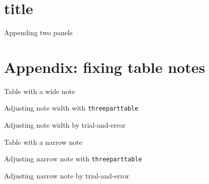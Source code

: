 \documentclass[11pt,a4paper]{article}
\begin{document}
\section{title}
\begin{table}[H]
	\centering
	\caption{Appending two panels}
	\begin{adjustbox}{max width = \textwidth}
		\begin{threeparttable}
			
		\end{threeparttable}
	\end{adjustbox}
\end{table}


\section*{Appendix: fixing table notes}
\setcounter{table}{0}
\renewcommand{\thetable}{A\arabic{table}}
 
\begin{table}[H]
	\centering
	\caption{Table with a wide note}
		
\end{table} 
 
\begin{table}[H]
	\centering
	\caption{Adjusting note width with \texttt{threeparttable}}
	\begin{adjustbox}{max width = \textwidth}
		\begin{threeparttable}
			
		\end{threeparttable}
	\end{adjustbox}
\end{table}


\begin{table}[H]
	\centering
	\caption{Adjusting note width by trial-and-error}
	
\end{table}  

\begin{table}[H]
	\centering
	\caption{Table with a narrow note}
	
\end{table} 

\begin{table}[H]
	\centering
	\caption{Adjusting narrow note with \texttt{threeparttable}}
	\begin{adjustbox}{max width = \textwidth}
		\begin{threeparttable}
			
		\end{threeparttable}
	\end{adjustbox}
\end{table}

\begin{table}[H]
	\centering
	\caption{Adjusting narrow note by trial-and-error}
		\begin{adjustbox}{max width = \textwidth}
		\begin{threeparttable}
			
		\end{threeparttable}
	\end{adjustbox}
\end{table}  
\end{document}
